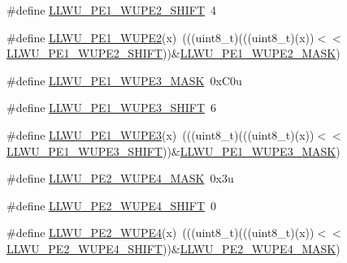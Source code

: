 \begin{DoxyCompactItemize}
\item 
\#define \hyperlink{group___l_l_w_u___register___masks_ga0b1bb86eb31a82a18ad1491b0305000b}{L\+L\+W\+U\+\_\+\+P\+E1\+\_\+\+W\+U\+P\+E2\+\_\+\+S\+H\+I\+FT}~4
\item 
\#define \hyperlink{group___l_l_w_u___register___masks_gae6a462624a848afff074ae6e6da83cb0}{L\+L\+W\+U\+\_\+\+P\+E1\+\_\+\+W\+U\+P\+E2}(x)~(((uint8\+\_\+t)(((uint8\+\_\+t)(x))$<$$<$\hyperlink{group___l_l_w_u___register___masks_ga0b1bb86eb31a82a18ad1491b0305000b}{L\+L\+W\+U\+\_\+\+P\+E1\+\_\+\+W\+U\+P\+E2\+\_\+\+S\+H\+I\+FT}))\&\hyperlink{group___l_l_w_u___register___masks_ga97e8e2fc8ce673f6b4625d307bc94b4a}{L\+L\+W\+U\+\_\+\+P\+E1\+\_\+\+W\+U\+P\+E2\+\_\+\+M\+A\+SK})
\item 
\#define \hyperlink{group___l_l_w_u___register___masks_ga44cae929b3178e210eb5e1346a4ce997}{L\+L\+W\+U\+\_\+\+P\+E1\+\_\+\+W\+U\+P\+E3\+\_\+\+M\+A\+SK}~0x\+C0u
\item 
\#define \hyperlink{group___l_l_w_u___register___masks_gaceee1b1b6323ba4d33abf875718e885a}{L\+L\+W\+U\+\_\+\+P\+E1\+\_\+\+W\+U\+P\+E3\+\_\+\+S\+H\+I\+FT}~6
\item 
\#define \hyperlink{group___l_l_w_u___register___masks_ga3dfb03917664cd276f352b77e95624b9}{L\+L\+W\+U\+\_\+\+P\+E1\+\_\+\+W\+U\+P\+E3}(x)~(((uint8\+\_\+t)(((uint8\+\_\+t)(x))$<$$<$\hyperlink{group___l_l_w_u___register___masks_gaceee1b1b6323ba4d33abf875718e885a}{L\+L\+W\+U\+\_\+\+P\+E1\+\_\+\+W\+U\+P\+E3\+\_\+\+S\+H\+I\+FT}))\&\hyperlink{group___l_l_w_u___register___masks_ga44cae929b3178e210eb5e1346a4ce997}{L\+L\+W\+U\+\_\+\+P\+E1\+\_\+\+W\+U\+P\+E3\+\_\+\+M\+A\+SK})
\item 
\#define \hyperlink{group___l_l_w_u___register___masks_ga94128d26c60f13d22acf47200f4f37e0}{L\+L\+W\+U\+\_\+\+P\+E2\+\_\+\+W\+U\+P\+E4\+\_\+\+M\+A\+SK}~0x3u
\item 
\#define \hyperlink{group___l_l_w_u___register___masks_ga12aa6ffb998e5273a8dd548ac434ad41}{L\+L\+W\+U\+\_\+\+P\+E2\+\_\+\+W\+U\+P\+E4\+\_\+\+S\+H\+I\+FT}~0
\item 
\#define \hyperlink{group___l_l_w_u___register___masks_gadd7ab2866ab9683237ee5d6c003cf2aa}{L\+L\+W\+U\+\_\+\+P\+E2\+\_\+\+W\+U\+P\+E4}(x)~(((uint8\+\_\+t)(((uint8\+\_\+t)(x))$<$$<$\hyperlink{group___l_l_w_u___register___masks_ga12aa6ffb998e5273a8dd548ac434ad41}{L\+L\+W\+U\+\_\+\+P\+E2\+\_\+\+W\+U\+P\+E4\+\_\+\+S\+H\+I\+FT}))\&\hyperlink{group___l_l_w_u___register___masks_ga94128d26c60f13d22acf47200f4f37e0}{L\+L\+W\+U\+\_\+\+P\+E2\+\_\+\+W\+U\+P\+E4\+\_\+\+M\+A\+SK})
\item 
$$
\end{DoxyCompactItemize}
